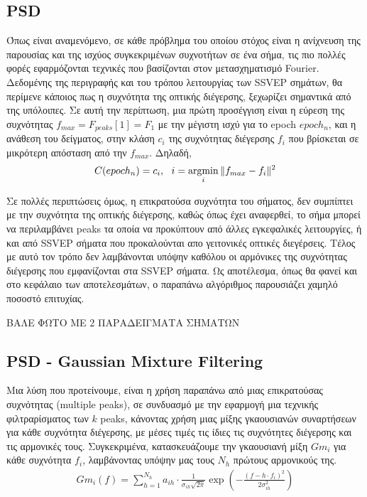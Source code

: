 \documentclass[11pt,a4paper,english,greek,twoside]{../Thesis}
\begin{document}
\subsection{PSD}
\par Όπως είναι αναμενόμενο, σε κάθε πρόβλημα του οποίου στόχος είναι η ανίχνευση της παρουσίας και της ισχύος συγκεκριμένων συχνοτήτων σε ένα σήμα, τις πιο πολλές φορές εφαρμόζονται τεχνικές που βασίζονται στον μετασχηματισμό Fourier. Δεδομένης της περιγραφής και του τρόπου λειτουργίας των SSVEP σημάτων, θα περίμενε κάποιος πως η συχνότητα της οπτικής διέγερσης, ξεχωρίζει σημαντικά από της υπόλοιπες. Σε αυτή την περίπτωση, μια πρώτη προσέγγιση είναι η εύρεση της συχνότητας $f_{max}=F_{peaks}[1]=F_1$ με την μέγιστη ισχύ για το epoch $epoch_n$, και η ανάθεση του δείγματος, στην κλάση $c_i$ της συχνότητας διέγερσης $f_i$ που βρίσκεται σε μικρότερη απόσταση από την $f_{max}$. Δηλαδή,
\begin{align}%
    C(epoch_n) = c_i, \ \  i=\argmin_{i} \Vert f_{max}-f_i \Vert ^2
\end{align}
\par Σε πολλές περιπτώσεις όμως, η επικρατούσα συχνότητα του σήματος, δεν συμπίπτει με την συχνότητα της οπτικής διέγερσης, καθώς όπως έχει αναφερθεί, το σήμα μπορεί να περιλαμβάνει peaks τα οποία να προκύπτουν από άλλες εγκεφαλικές λειτουργίες, ή και από SSVEP σήματα που προκαλούνται απο γειτονικές οπτικές διεγέρσεις. Τέλος με αυτό τον τρόπο δεν λαμβάνονται υπόψην καθόλου οι αρμόνικες της συχνότητας διέγερσης που εμφανίζονται στα SSVEP σήματα. Ως αποτέλεσμα, όπως θα φανεί και στο κεφάλαιο των αποτελεσμάτων, ο παραπάνω αλγόριθμος παρουσιάζει χαμηλό ποσοστό επιτυχίας.
\par ΒΑΛΕ ΦΩΤΟ ΜΕ 2 ΠΑΡΑΔΕΙΓΜΑΤΑ ΣΗΜΑΤΩΝ

\subsection{PSD - Gaussian Mixture Filtering}
\par Μια λύση που προτείνουμε, είναι η χρήση παραπάνω από μιας επικρατούσας συχνότητας (multiple peaks), σε συνδυασμό με την εφαρμογή μια τεχνικής φιλτραρίσματος των $k$ peaks, κάνοντας χρήση μιας μίξης γκαουσιανών συναρτήσεων για κάθε συχνότητα διέγερσης, με μέσες τιμές τις ίδιες τις συχνότητες διέγερσης και τις αρμονικές τους. Συγκεκριμένα, κατασκευάζουμε την γκαουσιανή μίξη $Gm_i$ για κάθε συχνότητα $f_i$, λαμβάνοντας υπόψην μας τους $N_h$ πρώτους αρμονικούς της. 
\begin{align}%
    Gm_i(f)=\sum_{h=1}^{N_h}a_{ih}\cdot \frac{1}{\sigma_{ih} \sqrt{2 \pi}}\exp(-\frac{(f-h\cdot f_i)^2}{2 \sigma_{ih}^2})
\end{align}
\end{document}
